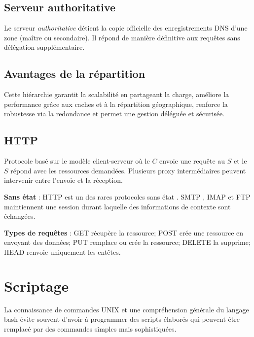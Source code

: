 \documentclass[a4paper, 14pt]{report}
\begin{document}
\section{Serveur authoritative}
    Le serveur \textit{authoritative} détient la copie officielle
    des enregistrements DNS d’une zone (maître ou secondaire).
    Il répond de manière définitive aux requêtes sans délégation
    supplémentaire.

\section{Avantages de la répartition}
    Cette hiérarchie garantit la scalabilité en partageant
    la charge, améliore la performance grâce aux caches
    et à la répartition géographique, renforce la
    robustesse via la redondance et permet une
    gestion déléguée et sécurisée.


   \section{HTTP}
    Protocole basé sur le modèle client-serveur où le \( C \) envoie une requête 
    au \( S \) et le \( S \) répond avec les ressources demandées. Plusieurs 
    proxy intermédiaires peuvent intervenir entre l'envoie et la réception. 

    \textbf{\textsf{Sans état}} : HTTP  est un des rares 
    protocoles sans état  . SMTP  , IMAP et FTP maintiennent 
    une session durant laquelle des 
    informations de contexte sont échangées.


    \textbf{\textsf{Types de requêtes}} : GET récupère la ressource; POST   
    crée une ressource en envoyant des données; PUT  remplace ou crée la ressource; 
    DELETE la supprime; HEAD   renvoie uniquement les entêtes.

    \chapter{Scriptage}
    La connaissance de commandes UNIX et une compréhension générale 
    du langage bash évite souvent d'avoir à programmer des scripts 
    élaborés qui peuvent être remplacé par des commandes
    simples mais sophistiquées.  
\end{document}
